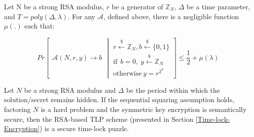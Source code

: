 



\begin{assumption}\label{assumption::SequentialSquaring} Let N be a  strong RSA modulus, $r$ be a generator of $\mathbb{Z}_{\scriptscriptstyle N}$,   $\Delta$ be a time parameter, and $T=poly(\Delta,\lambda)$. For  any $\mathcal{A}$, defined above,  there is a negligible function $\mu(.)$ such that: 

$$ Pr\left[
  \begin{array}{l}
\mathcal{A}(N, r,y) \rightarrow b
\end{array} 
\middle |
    \begin{array}{l}
r \stackrel{\scriptscriptstyle \$}\leftarrow \mathbb{Z}_{\scriptscriptstyle N}, b\stackrel{\scriptscriptstyle \$}\leftarrow \{0,1\}\\
\text{if} \ \ b=0,\   y \stackrel{\scriptscriptstyle \$}\leftarrow \mathbb{Z}_{\scriptscriptstyle N} \\
\text {otherwise}\ y=r^{\scriptscriptstyle 2^{\scriptscriptstyle T}}
\end{array}    \right]\leq \frac{1}{2}+\mu(\lambda)$$

\end{assumption}






\begin{theorem}\label{theorem::R-LTP-Sec}
Let $N$ be a  strong RSA modulus and $\Delta$ be the period within which the solution/secret remains hidden. If the sequential squaring assumption holds,  factoring $N$ is a hard problem and the symmetric key encryption is  semantically secure, then the RSA-based TLP scheme (presented in Section \ref{Time-lock-Encryption})  is a secure time-lock puzzle.
\end{theorem}



